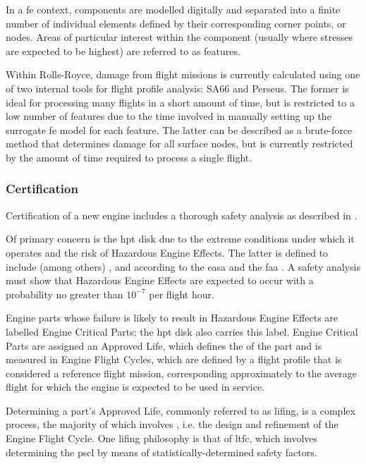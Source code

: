 In a \ac{fe} context, components are modelled digitally and separated into a finite number of individual elements defined by their corresponding corner points, or nodes. Areas of particular interest within the component (usually where stresses are expected to be highest) are referred to as features.

Within Rolls-Royce, damage from flight missions is currently calculated using one of two internal tools for flight profile analysis: SA66 and Perseus. %
The former is ideal for processing many flights in a short amount of time, but is restricted to a low number of features due to the time involved in manually setting up the surrogate \ac{fe} model for each feature. The latter can be described as a brute-force method that determines damage for all surface nodes, but is currently restricted by the amount of time required to process a single flight.

\subsubsection{Certification}
Certification of a new engine includes a thorough safety analysis as described in \cite{easa_certification_2015}.

Of primary concern is the \ac{hpt} disk due to the extreme conditions under which it operates and the risk of Hazardous Engine Effects. The latter is defined to include (among others) ,  and  according to the \ac{easa} and the \ac{faa} \cite{easa_certification_2015, faa_guidance_2007}. A safety analysis must show that Hazardous Engine Effects are expected to occur with a probability no greater than \(10^{-7}\) per flight hour.

Engine parts whose failure is likely to result in Hazardous Engine Effects are labelled Engine Critical Parts; the \ac{hpt} disk also carries this label. Engine Critical Parts are assigned an Approved Life, which defines the  \cite{easa_certification_2015} of the part and is measured in Engine Flight Cycles, which are defined by a flight profile that is considered a reference flight mission, corresponding approximately to the average flight for which the engine is expected to be used in service.

Determining a part's Approved Life, commonly referred to as lifing, is a complex process, the majority of which involves  \cite{corran_lifing_2007}, i.e. the design and refinement of the Engine Flight Cycle. One lifing philosophy is that of \ac{ltfc}, which involves determining the \ac{pscl} by means of statistically-determined safety factors.

